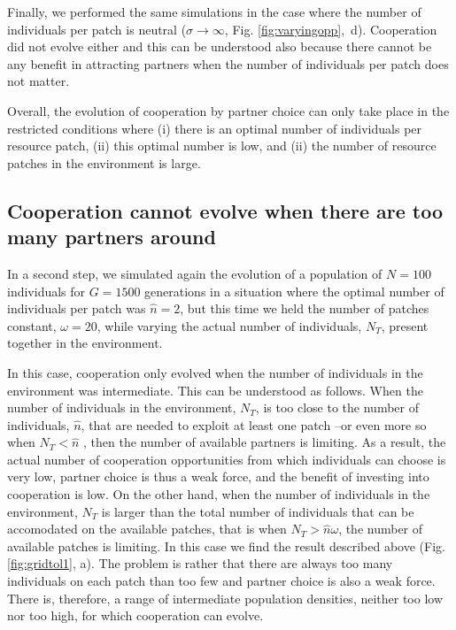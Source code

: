\documentclass[twocolumn]{article}
\begin{document}
Finally, we performed the same simulations in the case where the number of individuals per patch is neutral ($\sigma \rightarrow \infty$, Fig. \ref{fig:varyingopp}, d). Cooperation did not evolve either and this can be understood also because there cannot be any benefit in attracting partners when the number of individuals per patch does not matter.

Overall, the evolution of cooperation by partner choice can only take place in the restricted conditions where (i) there is an optimal number of individuals per resource patch, (ii) this optimal number is low, and (ii) the number of resource patches in the environment is large.


\subsection{Cooperation cannot evolve when there are too many partners around}

In a second step, we simulated again the evolution of a population of $N=100$ individuals for $G=1500$ generations in a situation where the optimal number of individuals per patch was $\hat{n}=2$, but this time we held the number of patches constant, $\omega = 20$, while varying the actual number of individuals, $N_T$, present together in the environment.

In this case, cooperation only evolved when the number of individuals in the environment was intermediate. This can be understood as follows. When the number of individuals in the environment, $N_T$, is too close to the number of individuals, $\hat{n}$, that are needed to exploit at least one patch --or even more so when $N_T < \hat{n}$ , then the number of available partners is limiting. As a result, the actual number of cooperation opportunities from which individuals can choose is very low, partner choice is thus a weak force, and the benefit of investing into cooperation is low. On the other hand, when the number of individuals in the environment, $N_T$ is larger than the total number of individuals that can be accomodated on the available patches, that is when $N_T > \hat{n} \omega$, the number of available patches is limiting. In this case we find the result described above (Fig. \ref{fig:gridtol1}, a). The problem is rather that there are always too many individuals on each patch than too few and partner choice is also a weak force. There is, therefore, a range of intermediate population densities, neither too low nor too high, for which cooperation can evolve.
\end{document}
